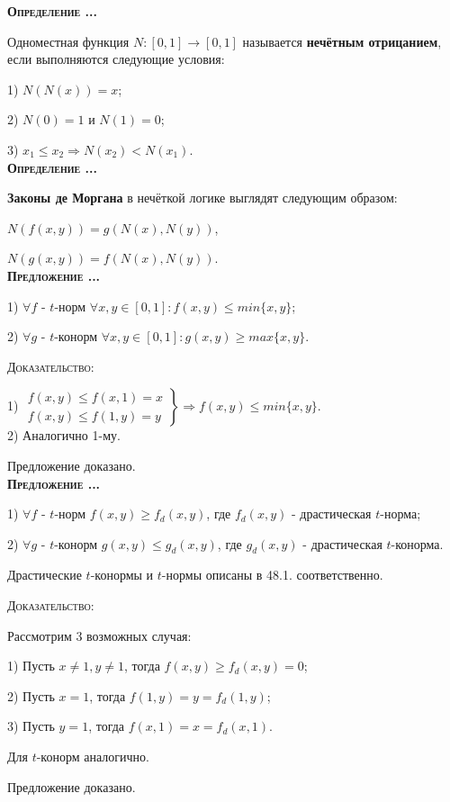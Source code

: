 \documentclass[18pt, a4paper]{extarticle}
\newcounter{par}
\newcounter{spar}
\newcounter{zap}
\newcommand{\opr}{\textbf{\textsc{Определение \thepar.\if\thespar1\thespar.\fi\thezap.\;}}\stepcounter{zap}}
\newcommand{\predl}{\textbf{\textsc{Предложение \thepar.\if\thespar1\thespar.\fi\thezap.\;}}\stepcounter{zap}}
\newcommand{\dok}{\textsc{Доказательство:}}
\begin{document}
\opr 

Одноместная функция $N\!\!:\![0,1]\to[0,1]$ называется \textbf{нечётным отрицанием}, если выполняются следующие условия:

1) $N(N(x))=x$;

2) $N(0)=1$ и $N(1)=0$;

3) $x_1\leqslant x_2\Rightarrow N(x_2)<N(x_1)$.\\

\opr

\textbf{Законы де Моргана} в нечёткой логике выглядят следующим образом:

$N(f(x,y))=g(N(x),N(y))$,

$N(g(x,y))=f(N(x),N(y))$.\\

\predl

1) $\forall f$ - $t$-норм $\forall x,y\in[0,1]\!: f(x,y)\leqslant min\{x,y\}$;

2) $\forall g$ - $t$-конорм $\forall x,y\in[0,1]\!: g(x,y)\geqslant max\{x,y\}$.

\dok 

1) $\left.
  \begin{array}{c}
    f(x,y)\leqslant f(x,1)=x \\
    f(x,y)\leqslant f(1,y)=y
  \end{array}
  \right\}\Rightarrow f(x,y)\leqslant min\{x,y\}.$\\
  
2) Аналогично 1-му.

Предложение доказано.\\

\predl


1) $\forall f$ - $t$-норм $f(x,y)\geqslant f_d(x,y)$, где $f_d(x,y)$ - драстическая $t$-норма;

2) $\forall g$ - $t$-конорм $g(x,y)\leqslant g_d(x,y)$, где $g_d(x,y)$ - драстическая $t$-конорма.

Драстические $t$-конормы и $t$-нормы описаны в 48.1. соответственно.

\dok

Рассмотрим 3 возможных случая:

1) Пусть $x\neq 1,y\neq1$, тогда $f(x,y)\geqslant f_d(x,y)=0$;

2) Пусть $x=1$, тогда $f(1,y)=y=f_d(1,y)$;

3) Пусть $y=1$, тогда $f(x,1)=x=f_d(x,1)$.

Для $t$-конорм аналогично.

Предложение доказано.
\end{document}
